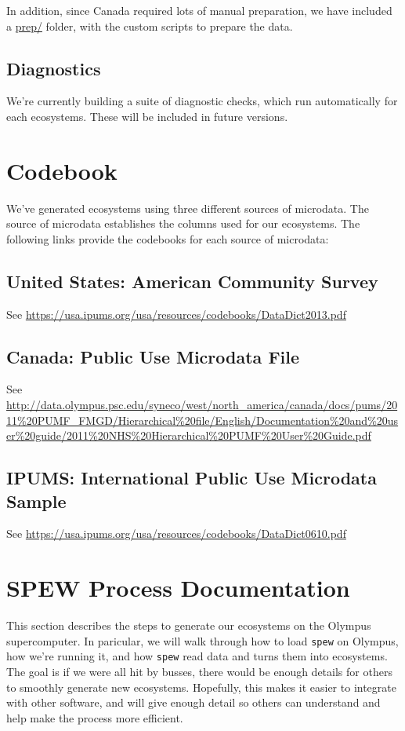 \documentclass{article}
\begin{document}
In addition, since Canada required lots of manual preparation, we have included a \url{prep/} folder, with the custom scripts to prepare the data. 

\subsection{Diagnostics}
We're currently building a suite of diagnostic checks, which run automatically for each ecosystems. These will be included in future versions.

\newpage
\nocite{*}
\printbibliography

\newpage 
\appendix

\section{Codebook}
We've generated ecosystems using three different sources of microdata. The source of microdata establishes the columns used for our ecosystems. The following links provide the codebooks for each source of microdata:

\subsection{United States: American Community Survey}
	See \url{https://usa.ipums.org/usa/resources/codebooks/DataDict2013.pdf}

\subsection{Canada: Public Use Microdata File}
	See \url{http://data.olympus.psc.edu/syneco/west/north_america/canada/docs/pums/2011%20PUMF_FMGD/Hierarchical%20file/English/Documentation%20and%20user%20guide/2011%20NHS%20Hierarchical%20PUMF%20User%20Guide.pdf}

\subsection{IPUMS: International Public Use Microdata Sample}
	See \url{https://usa.ipums.org/usa/resources/codebooks/DataDict0610.pdf}


\newpage 
\section{SPEW Process Documentation}
This section describes the steps to generate our ecosystems on the Olympus supercomputer. In paricular, we will walk through how to load \verb|spew| on Olympus, how we're running it, and how \verb|spew| read data and turns them into ecosystems. The goal is if we were all hit by busses, there would be enough details for others to smoothly generate new ecosystems. Hopefully, this makes it easier to integrate with other software, and will give enough detail so others can understand and help make the process more efficient. 
\end{document}
